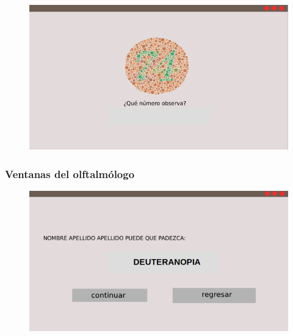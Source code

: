 \documentclass[10pt]{article}
\begin{document}
\begin{figure}[H]
	\begin{center}
\includegraphics[scale = 0.50]{Imagenes/Ventana5.png}
	\end{center} 
\end{figure}

\subsubsection{Ventanas del olftalmólogo}


\begin{figure}[H]
	\begin{center}
\includegraphics[scale = 0.60]{Imagenes/Ventana6.png}
	\end{center} 
\end{figure}
\end{document}
